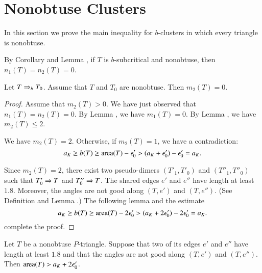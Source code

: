 \section{Nonobtuse Clusters}

In this section we prove the main inequality for $b$-clusters in which every
triangle is nonobtuse.

By Corollary  and Lemma , 
if $T$ is $b$-subcritical and nonobtuse, then $n_1(T)=n_2(T)=0$.


\begin{lemma} Let $T\Rightarrow_{b} T_0$. Assume that $T$ and $T_0$ are nonobtuse.
Then $m_2(T)=0$.
\end{lemma}

\begin{proof}  Assume that $m_2(T)>0$.  We have just observed that $n_1(T)=n_2(T)=0$.
By Lemma , we have $m_1(T)=0$.
By Lemma , we have $m_2(T)\le 2$. 


We have $m_2(T)=2$.  Otherwise, if $m_2(T)=1$, we have a contradiction:
\[
a_K \ge b(T) \ge {\operatorname{area}}(T) - \epsilon_0' > (a_K + \epsilon_0') - \epsilon_0' = a_K.
\]

Since $m_2(T)=2$, there exist two pseudo-dimers $(T'_1,T'_0)$ and $(T''_1,T''_0)$ such that
$T'_0\Rightarrow T$ and $T''_0\Rightarrow T$.  The shared edges $e'$ and $e''$ have length at least $1.8$.
Moreover, the angles are not good along $(T,e')$ and $(T,e'')$.  (See Definition  and Lemma .)
The following lemma and the estimate 
\[
a_K \ge b(T) \ge {\operatorname{area}}(T) - 2\epsilon_0' > (a_K + 2\epsilon_0') - 2\epsilon_0' = a_K.
\]
complete the proof.
\end{proof}

\begin{lemma} Let $T$ be a nonobtuse $P$-triangle.  Suppose that two of its edges $e'$ and $e''$ have length at least $1.8$
and that the angles are not good along $(T,e')$ and $(T,e'')$.  Then ${\operatorname{area}}(T) > a_K + 2\epsilon_0'$.
\end{lemma}

